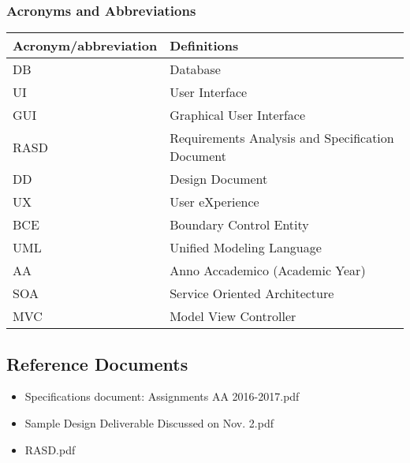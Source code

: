 \subsubsection{Acronyms and Abbreviations}
\begin{center}
	\begin{tabular} { | m{5cm} | m{8cm} | }
		\hline
		\textbf{Acronym/abbreviation} & \textbf{Definitions}\\
		\hline
		DB & Database\\
		\hline
		UI & User Interface\\
		\hline
		GUI & Graphical User Interface\\
		\hline
		RASD & Requirements Analysis and Specification Document\\
		\hline
		DD & Design Document\\
		\hline
		UX & User eXperience\\
		\hline
		BCE & Boundary Control Entity\\
		\hline
		UML & Unified Modeling Language\\
		\hline
		AA & Anno Accademico (Academic Year)\\
		\hline
		SOA & Service Oriented Architecture \\
		\hline
		MVC & Model View Controller\\
		\hline
\end{tabular}
\end{center}  

\subsection{Reference Documents}  
\begin{itemize}
	\item Specifications document: Assignments AA 2016-2017.pdf
	\item Sample Design Deliverable Discussed on Nov. 2.pdf
	\item RASD.pdf
\end{itemize} 
\newpage
